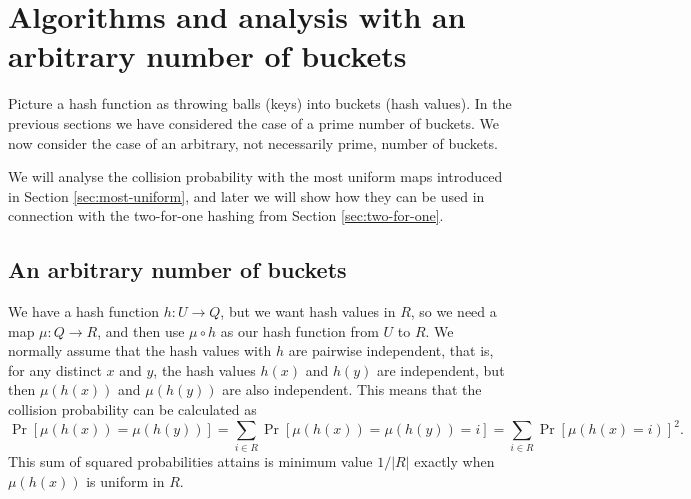 
\section{Algorithms and analysis with an arbitrary number of buckets}\label{sec:arbitrary-buckets}

Picture a hash function as throwing balls (keys) into buckets (hash values).
In the previous sections we have considered the case of a prime number of buckets.
We now consider the case of an arbitrary, not necessarily prime, number of buckets.

We will analyse the collision probability with the most uniform maps introduced in Section \ref{sec:most-uniform}, and later we will show how they can be used in connection with the two-for-one hashing from Section \ref{sec:two-for-one}.

\subsection{An arbitrary number of buckets}

We have a hash function $h:U\to Q$, but we want hash values in $R$, so we need a map $\mu:Q\to R$, and then use $\mu\circ h$ as our hash function from $U$ to $R$.
We normally assume that the hash values with $h$ are pairwise independent, that is, for any distinct $x$ and $y$, the hash values $h(x)$ and $h(y)$ are independent, but then $\mu(h(x))$ and $\mu(h(y))$ are also independent.
This means that the collision probability can be calculated as \[\Pr[\mu(h(x))=\mu(h(y))]=\sum_{i\in R}\Pr[\mu(h(x))=\mu(h(y))=i]=\sum_{i\in R}\Pr[\mu(h(x)=i)]^2.
\]
This sum of squared probabilities attains is minimum value $1/|R|$
exactly when $\mu(h(x))$ is uniform in $R$.

